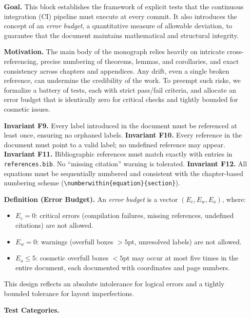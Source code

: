 \noindent \textbf{Goal.} This block establishes the framework of explicit tests that the continuous integration (CI) pipeline must execute at every commit. It also introduces the concept of an \emph{error budget}, a quantitative measure of allowable deviation, to guarantee that the document maintains mathematical and structural integrity.

\medskip
\noindent \textbf{Motivation.} The main body of the monograph relies heavily on intricate cross-referencing, precise numbering of theorems, lemmas, and corollaries, and exact consistency across chapters and appendices. Any drift, even a single broken reference, can undermine the credibility of the work. To preempt such risks, we formalize a battery of tests, each with strict pass/fail criteria, and allocate an error budget that is identically zero for critical checks and tightly bounded for cosmetic issues.

\medskip
\noindent \textbf{Invariant F9.} Every label introduced in the document must be referenced at least once, ensuring no orphaned labels.  
\textbf{Invariant F10.} Every reference in the document must point to a valid label; no undefined reference may appear.  
\textbf{Invariant F11.} Bibliographic references must match exactly with entries in \texttt{references.bib}. No “missing citation” warning is tolerated.  
\textbf{Invariant F12.} All equations must be sequentially numbered and consistent with the chapter-based numbering scheme (\texttt{\textbackslash numberwithin\{equation\}\{section\}}).  

\medskip
\noindent \textbf{Definition (Error Budget).} An \emph{error budget} is a vector $(E_c, E_w, E_o)$, where:
\begin{itemize}
  \item $E_c = 0$: critical errors (compilation failures, missing references, undefined citations) are not allowed.
  \item $E_w = 0$: warnings (overfull boxes $>5$pt, unresolved labels) are not allowed.
  \item $E_o \leq 5$: cosmetic overfull boxes $<5$pt may occur at most five times in the entire document, each documented with coordinates and page numbers.
\end{itemize}
This design reflects an absolute intolerance for logical errors and a tightly bounded tolerance for layout imperfections.

\medskip
\noindent \textbf{Test Categories.}

